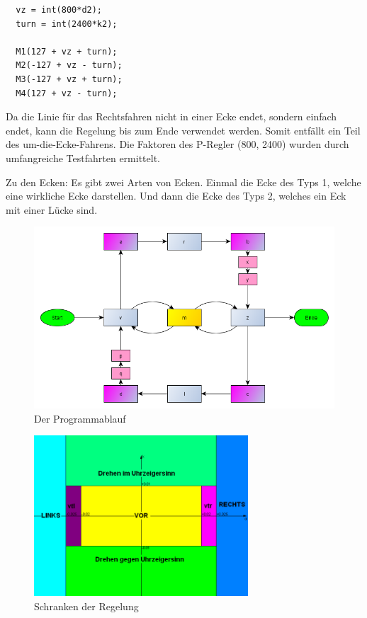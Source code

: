 \documentclass[a4paper,bibtotoc,oneside]{scrbook}
\begin{document}
\begin{verbatim}
  vz = int(800*d2);
  turn = int(2400*k2);

  M1(127 + vz + turn);
  M2(-127 + vz - turn);
  M3(-127 + vz + turn);
  M4(127 + vz - turn); 
\end{verbatim}

Da die Linie für das Rechtsfahren nicht in einer Ecke endet, sondern einfach endet, kann die Regelung bis zum Ende verwendet werden. Somit entfällt ein Teil des um-die-Ecke-Fahrens. Die Faktoren des P-Regler (800, 2400) wurden durch umfangreiche Testfahrten ermittelt.

Zu den Ecken: Es gibt zwei Arten von Ecken. Einmal die Ecke des Typs 1, welche eine wirkliche Ecke darstellen. Und dann die Ecke des Typs 2, welches ein Eck mit einer Lücke sind.

\begin{figure}[htbp]
\centering
\includegraphics[width=150mm]{img/ablauf2.png}
\caption{Der Programmablauf}\label{abl}
\end{figure}

\begin{figure}[htbp]
\centering
\includegraphics[width=80mm]{img/schranken.png}
\caption{Schranken der Regelung}\label{schr}
\end{figure}
\end{document}
